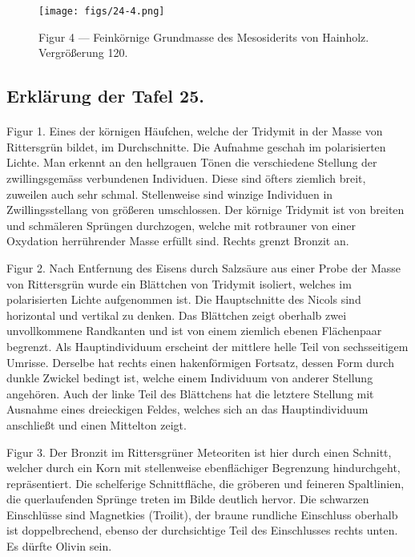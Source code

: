 \documentclass[a4paper, 11pt, oneside, polutonikogreek, german]{article}
\begin{document}
\vspace*{\fill}
\begin{figure}[H]
\centering
\texttt{[image: figs/24-4.png]}
\caption{\small Figur 4 --- Feinkörnige Grundmasse des Mesosiderits von Hainholz. Vergrößerung 120.}
\end{figure}
\vspace*{\fill}
\clearpage

\subsection{Erklärung der Tafel 25.}
\paragraph{}
Figur 1. Eines der körnigen Häufchen, welche der Tridymit in der Masse von Rittersgrün bildet, im Durchschnitte. Die Aufnahme geschah im polarisierten Lichte. Man erkennt an den hellgrauen Tönen die verschiedene Stellung der zwillingsgemäss verbundenen Individuen. Diese sind öfters ziemlich breit, zuweilen auch sehr schmal. Stellenweise sind winzige Individuen in Zwillingsstellang von größeren umschlossen. Der körnige Tridymit ist von breiten und schmäleren Sprüngen durchzogen, welche mit rotbrauner von einer Oxydation herrührender Masse erfüllt sind. Rechts grenzt Bronzit an.

Figur 2. Nach Entfernung des Eisens durch Salzsäure aus einer Probe der Masse von Rittersgrün wurde ein Blättchen von Tridymit isoliert, welches im polarisierten Lichte aufgenommen ist. Die Hauptschnitte des Nicols sind horizontal und vertikal zu denken. Das Blättchen zeigt oberhalb zwei unvollkommene Randkanten und ist von einem ziemlich ebenen Flächenpaar begrenzt. Als Hauptindividuum erscheint der mittlere helle Teil von sechsseitigem Umrisse. Derselbe hat rechts einen hakenförmigen Fortsatz, dessen Form durch dunkle Zwickel bedingt ist, welche einem Individuum von anderer Stellung angehören. Auch der linke Teil des Blättchens hat die letztere Stellung mit Ausnahme eines dreieckigen Feldes, welches sich an das Hauptindividuum anschließt und einen Mittelton zeigt.

Figur 3. Der Bronzit im Rittersgrüner Meteoriten ist hier durch einen Schnitt, welcher durch ein Korn mit stellenweise ebenflächiger Begrenzung hindurchgeht, repräsentiert. Die schelferige Schnittfläche, die gröberen und feineren Spaltlinien, die querlaufenden Sprünge treten im Bilde deutlich hervor. Die schwarzen Einschlüsse sind Magnetkies (Troilit), der braune rundliche Einschluss oberhalb ist doppelbrechend, ebenso der durchsichtige Teil des Einschlusses rechts unten. Es dürfte Olivin sein.
\end{document}
